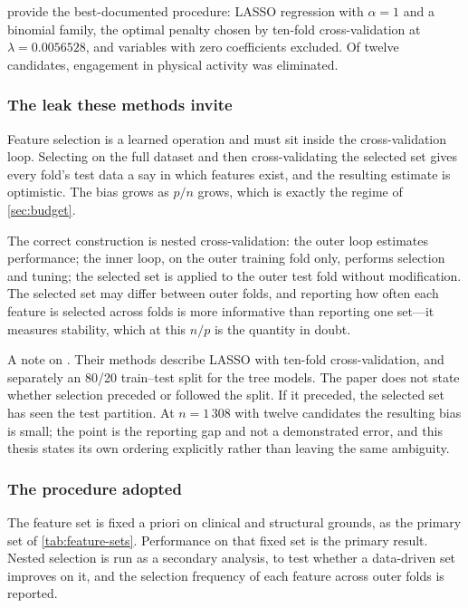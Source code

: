 \documentclass[12pt,a4paper,oneside]{report}
\begin{document}
\Textcite{mendoza2025} provide the best-documented procedure: LASSO regression with $\alpha = 1$ and a binomial family, the optimal penalty chosen by ten-fold cross-validation at $\lambda = 0.0056528$, and variables with zero coefficients excluded. Of twelve candidates, engagement in physical activity was eliminated.

\subsubsection{The leak these methods invite}\label{sec:nested}

Feature selection is a learned operation and must sit inside the cross-validation loop. Selecting on the full dataset and then cross-validating the selected set gives every fold's test data a say in which features exist, and the resulting estimate is optimistic. The bias grows as $p/n$ grows, which is exactly the regime of \cref{sec:budget}.

The correct construction is nested cross-validation: the outer loop estimates performance; the inner loop, on the outer training fold only, performs selection and tuning; the selected set is applied to the outer test fold without modification. The selected set may differ between outer folds, and reporting how often each feature is selected across folds is more informative than reporting one set---it measures stability, which at this $n/p$ is the quantity in doubt.

A note on \textcite{mendoza2025}. Their methods describe LASSO with ten-fold cross-validation, and separately an 80/20 train--test split for the tree models. The paper does not state whether selection preceded or followed the split. If it preceded, the selected set has seen the test partition. At $n = 1\,308$ with twelve candidates the resulting bias is small; the point is the reporting gap and not a demonstrated error, and this thesis states its own ordering explicitly rather than leaving the same ambiguity.

\subsubsection{The procedure adopted}

The feature set is fixed a priori on clinical and structural grounds, as the primary set of \cref{tab:feature-sets}. Performance on that fixed set is the primary result. Nested selection is run as a secondary analysis, to test whether a data-driven set improves on it, and the selection frequency of each feature across outer folds is reported.
\end{document}
